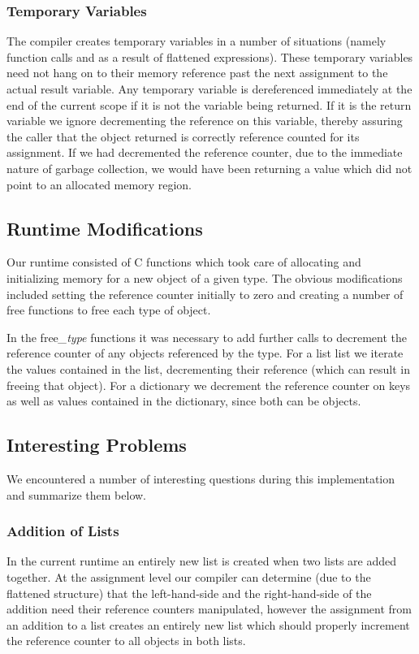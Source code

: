 \documentclass{sigplanconf}
\begin{document}
\subsubsection{Temporary Variables}
The compiler creates temporary variables in a number of situations (namely function calls and as a result of flattened expressions).  These temporary variables need not hang on to their memory reference past the next assignment to the actual result variable.  Any temporary variable is dereferenced immediately at the end of the current scope if it is not the variable being returned.  If it is the return variable we ignore decrementing the reference on this variable, thereby assuring the caller that the object returned is correctly reference counted for its assignment.  If we had decremented the reference counter, due to the immediate nature of garbage collection, we would have been returning a value which did not point to an allocated memory region.
\subsection{Runtime Modifications}
Our runtime consisted of C functions which took care of allocating and initializing memory for a new object of a given type.  The obvious modifications included setting the reference counter initially to zero and creating a number of free functions to free each type of object.
\par
In the free\emph{\_type} functions it was necessary to add further calls to decrement the reference counter of any objects referenced by the type.  For a list list we iterate the values contained in the list, decrementing their reference (which can result in freeing that object).  For a dictionary we decrement the reference counter on keys as well as values contained in the dictionary, since both can be objects.
\subsection{Interesting Problems}
We encountered a number of interesting questions during this implementation and summarize them below.
\subsubsection{Addition of Lists}
In the current runtime an entirely new list is created when two lists are added together.  At the assignment level our compiler can determine (due to the flattened structure) that the left-hand-side and the right-hand-side of the addition need their reference counters manipulated, however the assignment from an addition to a list creates an entirely new list which should properly increment the reference counter to all objects in both lists.
\end{document}
